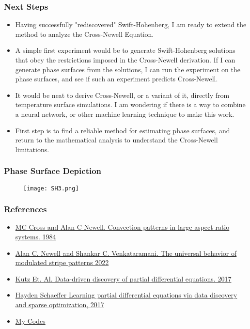 \documentclass[]{beamer}
\begin{document}
\begin{frame}
     \frametitle{Next Steps}
     \begin{itemize}
         \item Having successfully "rediscovered" Swift-Hohenberg, I am ready to extend the method to analyze the Cross-Newell Equation.
        \item A simple first experiment would be to generate Swift-Hohenberg solutions that obey the restrictions imposed in the Cross-Newell derivation. If I can generate phase surfaces from the solutions, I can run the experiment on the phase surfaces, and see if such an experiment predicts Cross-Newell.
        \item It would be neat to derive Cross-Newell, or a variant of it, directly from temperature surface simulations. I am wondering if there is a way to combine a neural network, or other machine learning technique to make this work.
        \item First step is to find a reliable method for estimating phase surfaces, and return to the mathematical analysis to understand the Cross-Newell limitations.
     \end{itemize}
\end{frame}

\begin{frame}
     \frametitle{Phase Surface Depiction}
      \begin{figure}
        \centering
        \texttt{[image: SH3.png]}
        \end{figure}
\end{frame}







\begin{frame}
    \frametitle{References}
    \begin{itemize}
    \item \href{https://reader.elsevier.com/reader/sd/pii/0167278984901817?token=A7642367BF58BF047EA0B36FF9405D2765AECE238093AEE2121CD36F6E79244B94C8B9C1B05FEAC38C9E9A6C6C6C37DC&originRegion=us-east-1&originCreation=20221012224737}{MC Cross and Alan C Newell. Convection patterns in large aspect ratio systems. 1984}
    \item \href{https://www.cmu.edu/cee/convergence/preprints/UniversalBehaviorModulatedStripePatterns.pdf}{Alan C. Newell and Shankar C. Venkataramani. The universal behavior of modulated stripe patterns 2022}
    \item \href{https://www.science.org/doi/pdf/10.1126/sciadv.1602614}{Kutz Et. Al. Data-driven discovery of partial differential equations. 2017}
    \item \href{https://royalsocietypublishing.org/doi/pdf/10.1098/rspa.2016.0446}{Hayden Schaeffer Learning partial differential equations via data discovery and sparse optimization, 2017}
        \item \href{https://github.com/EMcDugald/convection_patterns}{My Codes}
    \end{itemize}
\end{frame}
\end{document}
